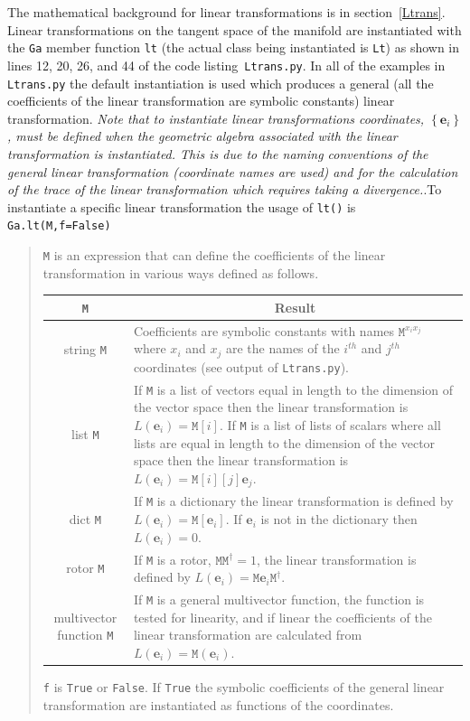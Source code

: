 \documentclass[12pt,twoside,openright]{memoir}
\newcommand{\bm}[1]{\boldsymbol{#1}}
\newcommand{\ebf}{\bm{e}}
\newcommand{\mat}[1]{\left [ {#1} \right ]}
\newcommand{\lp}{\left (}
\newcommand{\rp}{\right )}
\newcommand{\lbrc}{\left \{}
\newcommand{\rbrc}{\right \}}
\newcommand{\set}[1]{\lbrc {#1} \rbrc}
\newcommand{\R}{\dagger}
\newcommand{\f}[2]{{#1}\lp {#2} \rp}
\newcommand{\T}[1]{\texttt{#1}}
\begin{document}
The mathematical background for linear transformations is in section~\ref{Ltrans}.  Linear transformations on the tangent space of
the manifold are instantiated with the \T{Ga} member function \T{lt} (the actual class being instantiated is \T{Lt}) as shown in
 lines 12, 20, 26, and 44 of the 
code listing~\T{Ltrans.py}. In all of the examples in \T{Ltrans.py} the default instantiation is used which produces a general (all the
coefficients of the linear transformation are symbolic constants) linear transformation. \emph{Note that to instantiate linear transformations
coordinates, $\set{\bm{e}_{i}}$, must be defined when the geometric algebra associated with the linear transformation is instantiated.  
This is due to the naming conventions of the general linear transformation (coordinate names are used) and for the calculation 
of the trace of the linear transformation which requires taking a divergence.}.To instantiate a specific linear transformation
the usage of \T{lt()} is
\T{Ga.lt(M,f=False)}
\begin{quote}
	\T{M} is an expression that can define the coefficients of the linear transformation in various ways defined as follows.\newpage 
	\begin{center}
    \begin{longtable}{cl}
    \T{M} &  \multicolumn{1}{c}{Result} \\ \hline
	string \T{M} & \parbox[t]{4in}{Coefficients are symbolic constants with names $\T{M}^{x_{i}x_{j}}$ where $x_{i}$ 
					   and $x_{j}$ are the names
	of the $i^{th}$ and $j^{th}$ coordinates (see output of \T{Ltrans.py}). } \\ \hline
	list \T{M} & \parbox[t]{4in}{If \T{M} is a list of vectors equal in length to the dimension of the vector space then
	             the linear transformation is $\f{L}{\ebf_{i}} = \T{M}\mat{i}$. If \T{M} is a list of lists of scalars where all
	             lists are equal in length to the dimension of the vector space then the linear transformation is
	             $\f{L}{\ebf_{i}} = \T{M}\mat{i}\mat{j}\ebf_{j}$.} \\ \hline
	dict \T{M} & \parbox[t]{4in}{If \T{M} is a dictionary the linear transformation is defined by
	             $\f{L}{\ebf_{i}} = \T{M}\mat{\ebf_{i}}$. If $\ebf_{i}$ is not in the dictionary then $\f{L}{\ebf_{i}} =0$.} \\ \hline
	rotor \T{M} & \parbox[t]{4in}{If \T{M} is a rotor, $\T{M}\T{M}^{\R}=1$, the linear transformation is defined by 
	               $\f{L}{\ebf_{i}} = \T{M}\ebf_{i}\T{M}^{\R}$.} \\ \hline
	multivector function \T{M} & \parbox[t]{4in}{If \T{M} is a general multivector function, the function is tested for linearity, and if
	                             linear the coefficients of the linear transformation are calculated from 
	                             $\f{L}{\ebf_{i}} = \f{\T{M}}{\ebf_{i}}$.} \\ \hline 
	\end{longtable}
	\end{center}
	\vspace{-0.5in}\T{f} is \T{True} or \T{False}. If \T{True} the symbolic coefficients of the general linear transformation are instantiated as functions of the coordinates.
\end{quote}
\end{document}
